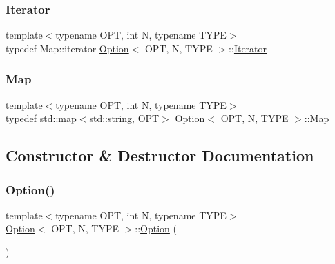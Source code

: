 \subsubsection{\texorpdfstring{Iterator}{Iterator}}
{\footnotesize\ttfamily template$<$typename O\+PT, int N, typename T\+Y\+PE$>$ \\
typedef Map\+::iterator \mbox{\hyperlink{class_option}{Option}}$<$ O\+PT, N, T\+Y\+PE $>$\+::\mbox{\hyperlink{class_option_a04dc85c3f4d2672befc47c9f87f2af7d}{Iterator}}\hspace{0.3cm}{\ttfamily [protected]}}

\mbox{\label{class_option_a4a16877e4cb71dc27ceb30aee15537c2}} 
\subsubsection{\texorpdfstring{Map}{Map}}
{\footnotesize\ttfamily template$<$typename O\+PT, int N, typename T\+Y\+PE$>$ \\
typedef std\+::map$<$std\+::string, O\+PT$>$ \mbox{\hyperlink{class_option}{Option}}$<$ O\+PT, N, T\+Y\+PE $>$\+::\mbox{\hyperlink{class_option_a4a16877e4cb71dc27ceb30aee15537c2}{Map}}\hspace{0.3cm}{\ttfamily [protected]}}



\subsection{Constructor \& Destructor Documentation}
\mbox{\label{class_option_ae37ce433cfe6b424ad7c83ade2a944a1}} 
\subsubsection{\texorpdfstring{Option()}{Option()}}
{\footnotesize\ttfamily template$<$typename O\+PT, int N, typename T\+Y\+PE$>$ \\
\mbox{\hyperlink{class_option}{Option}}$<$ O\+PT, N, T\+Y\+PE $>$\+::\mbox{\hyperlink{class_option}{Option}} (\begin{DoxyParamCaption}{ }\end{DoxyParamCaption})\hspace{0.3cm}{\ttfamily [inline]}}



